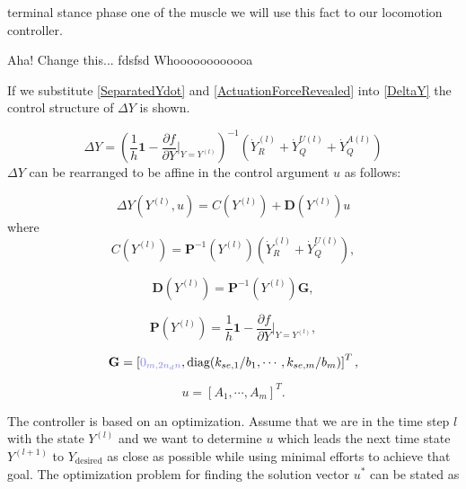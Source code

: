 \documentclass[a4paper,10pt]{article}
\begin{document}
terminal stance phase one
of the muscle  we will use this fact
to our locomotion controller.

Aha!
Change this...
fdsfsd
Whoooooooooooa~


If we substitute \eqref{SeparatedYdot} and \eqref{ActuationForceRevealed} into
\eqref{DeltaY} the control structure of $\Delta Y$ is shown.

\begin{equation}\label{DeltaYControl}
\Delta Y = \left(  \frac{1}{h}\mathbf{1} - {\frac{\partial f}{\partial Y} \bigg|_{Y=Y^{(l)}}}\right)^{-1} 
            \left( \dot{Y}_R^{(l)} + \dot{Y}_Q^{U(l)} + \dot{Y}_Q^{A(l)} \right)
\end{equation}
$\Delta Y$ can be rearranged to be affine in the control argument $u$ as follows:

\begin{equation}
\Delta Y(Y^{(l)}, u) = C(Y^{(l)}) + \mathbf{D}(Y^{(l)})u
\end{equation}
where
\begin{equation}
C(Y^{(l)}) = \mathbf{P}^{-1}(Y^{(l)}) \left( \dot{Y}_R^{(l)} + \dot{Y}_Q^{U(l)} \right),
\end{equation}

\begin{equation}
\mathbf{D}(Y^{(l)}) = \mathbf{P}^{-1}(Y^{(l)}) \mathbf{G},
\end{equation}

\begin{equation}\label{DeltaYMatrix}
\mathbf{P}(Y^{(l)}) = \frac{1}{h}\mathbf{1} - {\frac{\partial f}{\partial Y} \bigg|_{Y=Y^{(l)}}},
\end{equation}

\begin{equation}
\mathbf{G} = \left[ \zm{m, 2n_d n} , \text{diag}(k_{se,1}/b_1, \cdots, k_{se,m}/b_m) \right]^T,
\end{equation}

\begin{equation}
u = [A_1, \cdots, A_m]^T.
\end{equation}

The controller is based on an optimization. Assume that we are in
the time step $l$ with the state $Y^{(l)}$ and we want to determine $u$
which leads the next time state $Y^{(l+1)}$ to $Y_{\text{desired}}$
as close as possible while using minimal efforts to achieve that goal.
The optimization problem for finding the solution vector $u^*$ can be stated as
\end{document}
